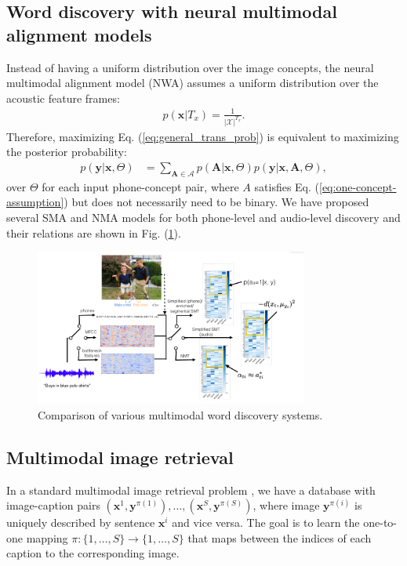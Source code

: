 \documentclass[journal]{IEEEtran}
\begin{document}
\subsection{Word discovery with neural multimodal alignment models}
Instead of having a uniform distribution over the image concepts, the neural multimodal alignment model (NWA) assumes a uniform distribution over the acoustic feature frames:
\begin{align}\label{eq:nmt_acoustic_prior}
    p(\mathbf x|T_x) = \frac{1}{|\mathcal X|^{T_x}}. 
\end{align}
Therefore, maximizing Eq. (\ref{eq:general_trans_prob}) is equivalent to maximizing the posterior probability:
\begin{align}\label{eq:nmt_trans_prob}
    p(\mathbf y|\mathbf x, \Theta) &= \sum_{\mathbf A \in \mathcal A} p(\mathbf A|\mathbf x, \Theta) p(\mathbf y|\mathbf x, \mathbf A, \Theta),
\end{align}
over $\Theta$ for each input phone-concept pair, where $A$ satisfies Eq. (\ref{eq:one-concept-assumption}) but does not necessarily need to be binary. We have proposed several SMA and NMA models for both phone-level and audio-level discovery and their relations are shown in Fig. (\ref{fig:model_comparison}).

\begin{figure}[t]
    \centering
    \includegraphics[width=0.8\textwidth]{fig_1.png}
    \caption{Comparison of various multimodal word discovery systems.}
    \label{fig:model_comparison}
\end{figure}

\subsection{Multimodal image retrieval}
In a standard multimodal image retrieval problem \cite{Karpathy14}, we have a database with image-caption pairs $(\mathbf x^1, \mathbf y^{\pi(1)}), \ldots, (\mathbf x^S, \mathbf y^{\pi(S)})$, where image $\mathbf y^{\pi(i)}$ is uniquely described by sentence $\mathbf x^i$ and vice versa. The goal is to learn the one-to-one mapping $\pi: \{1, \ldots, S\} \rightarrow \{1, \ldots, S\}$ that maps between the indices of each caption to the corresponding image. 
\end{document}
